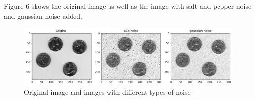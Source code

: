 \documentclass[12pt]{article}
\begin{document}
\subsection{}
Figure 6 shows the original image as well as the image with salt and pepper noise and gaussian noise added.
\begin{figure}[ht]
    \centering
        \includegraphics[width=1\columnwidth, keepaspectratio]{pics/a2-3.1-1}
    \caption[]{Original image and images with different types of noise}
    \label{fig:3.1}
    \end{figure}
   
\end{document}
